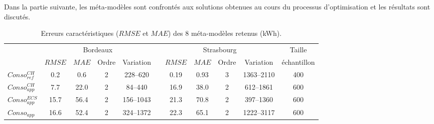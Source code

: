Dans la partie suivante, les méta-modèles sont confrontés aux solutions obtenues
au cours du processus d’optimisation et les résultats sont discutés.

\begin{table}
\centering
\caption[Erreurs caractéristiques des \num{8} méta-modèles retenus]
        {Erreurs caractéristiques ($RMSE$ et $MAE$) des \num{8} méta-modèles retenus (\si{kWh}).}
\label{tab:meta_result_bilan}
\begin{tabular}{l c c c c c c c c c c}
    \toprule
                    & \multicolumn{4}{c}{Bordeaux} & & \multicolumn{4}{c}{Strasbourg} &
                      Taille \\
                    \cmidrule(r){2-5}
                    \cmidrule(r){7-10}
                    & $RMSE$ & $MAE$  & Ordre & Variation  &       & $RMSE$ & $MAE$ & Ordre & Variation & échantillon \\
    \midrule
    $Conso_{ref}^{CH}$  & \num{0.2}  & \num{0.6}  & \num{2} & \numrange{228}{620}&   & \num{0.19}   & \num{0.93}  & \num{3}     & \numrange{1363}{2110}      & \num{400}  \\
    \addlinespace[\defaultaddspace]
    $Conso_{app}^{CH}$  & \num{7.7}  & \num{22.0} & \num{2} & \numrange{84}{440} &   & \num{16.9}   & \num{38.0}  & \num{2}     & \numrange{612}{1861}       & \num{600} \\
    \addlinespace[\defaultaddspace]
    $Conso_{app}^{ECS}$ & \num{15.7} & \num{56.4} & \num{2} & \numrange{156}{1043}&  & \num{21.3}   & \num{70.8}  & \num{2}     & \numrange{397}{1360}       & \num{600} \\
    \addlinespace[\defaultaddspace]
    $Conso_{app}$       & \num{16.6} & \num{52.4} & \num{2} & \numrange{324}{1372}&  & \num{22.3}   & \num{65.1}  & \num{2}     & \numrange{1222}{3117}       & \num{600} \\
    \bottomrule
\end{tabular}
\end{table}



